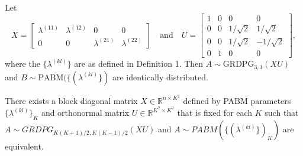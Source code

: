 \documentclass[12pt]{article}
\begin{document}
\begin{theorem}[Connecting the PABM to the GRDPG for $K = 2$]
\label{theorem1}  
Let 
$$X = \begin{bmatrix} 
\lambda^{(11)} & \lambda^{(12)} & 0 & 0 \\ 
0 & 0 & \lambda^{(21)} & \lambda^{(22)} 
\end{bmatrix} \quad \text{and} \quad
U = \begin{bmatrix} 1 & 0 & 0 & 0 \\
0 & 0 & 1 / \sqrt{2} & 1 / \sqrt{2} \\
0 & 0 & 1 / \sqrt{2} & - 1 / \sqrt{2} \\
0 & 1 & 0 & 0 \end{bmatrix},$$
where the $\{\lambda^{(kl)}\}$ are as defined in Definition 1. 
Then $A \sim \mathrm{GRDPG}_{3, 1}(X U)$ and $B \sim \mathrm{PABM}(\{(\lambda^{(kl)}\})$ are 
identically distributed.
\end{theorem}

\begin{theorem}[Generalization to $K > 2$] 
\label{theorem2}
There exists a block diagonal matrix 
$X \in \mathbb{R}^{n \times K^2}$ defined by PABM parameters 
$\{\lambda^{(kl)}\}_K$ and orthonormal matrix 
$U \in \mathbb{R}^{K^2 \times K^2}$ that is fixed 
for each $K$ such that $A \sim GRDPG_{K (K+1) / 2, K (K-1) / 2}(XU)$ and 
$A \sim PABM(\{(\lambda^{(kl)}\})_K)$ are equivalent.
\end{theorem}
\end{document}
